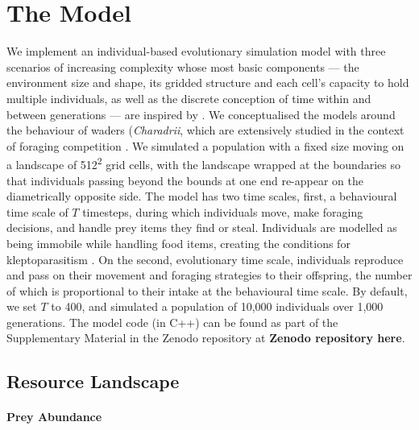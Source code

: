 \documentclass[11pt]{article}
\begin{document}
\section{The Model}

We implement an individual-based evolutionary simulation model with three scenarios of increasing complexity whose most basic components --- the environment size and shape, its gridded structure and each cell's capacity to hold multiple individuals, as well as the discrete conception of time within and between generations --- are inspired by \citet{netz2020}.
We conceptualised the models around the behaviour of waders (\textit{Charadrii}, which are extensively studied in the context of foraging competition \citep[e.g.][]{vahl2005, vahl2005b, vahl2007, rutten2010a, rutten2010}.
We simulated a population with a fixed size moving on a landscape of 512\textsuperscript{2} grid cells, with the landscape wrapped at the boundaries so that individuals passing beyond the bounds at one end re-appear on the diametrically opposite side.
The model has two time scales, first, a behavioural time scale of $T$ timesteps, during which individuals move, make foraging decisions, and handle prey items they find or steal.
Individuals are modelled as being immobile while handling food items, creating the conditions for kleptoparasitism \citep{brockmann1979}.
On the second, evolutionary time scale, individuals reproduce and pass on their movement and foraging strategies to their offspring, the number of which is proportional to their intake at the behavioural time scale.
By default, we set $T$ to 400, and simulated a population of 10,000 individuals over 1,000 generations.
The model code (in C++) can be found as part of the Supplementary Material in the Zenodo repository at \textbf{Zenodo repository here}.

\subsection{Resource Landscape}

\paragraph{Prey Abundance}
\end{document}
